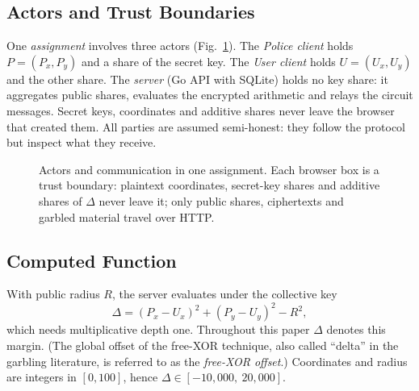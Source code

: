 \documentclass[conference,letterpaper]{IEEEtran}
\begin{document}
\subsection{Actors and Trust Boundaries}
One \emph{assignment} involves three actors (Fig.~\ref{fig:arch}). The \emph{Police client} holds $P = (P_x, P_y)$ and a share of the secret key. The \emph{User client} holds $U = (U_x, U_y)$ and the other share. The \emph{server} (Go API with SQLite) holds no key share: it aggregates public shares, evaluates the encrypted arithmetic and relays the circuit messages. Secret keys, coordinates and additive shares never leave the browser that created them. All parties are assumed semi-honest: they follow the protocol but inspect what they receive.

\begin{figure}[t]
\centering
{}
\caption{Actors and communication in one assignment. Each browser box is a trust boundary: plaintext coordinates, secret-key shares and additive shares of $\Delta$ never leave it; only public shares, ciphertexts and garbled material travel over HTTP.}
\label{fig:arch}
\end{figure}

\subsection{Computed Function}
With public radius $R$, the server evaluates under the collective key
\begin{equation}
\Delta = (P_x - U_x)^2 + (P_y - U_y)^2 - R^2 ,
\label{eq:delta}
\end{equation}
which needs multiplicative depth one. Throughout this paper $\Delta$ denotes this margin. (The global offset of the free-XOR technique, also called ``delta'' in the garbling literature, is referred to as the \emph{free-XOR offset}.) Coordinates and radius are integers in $[0, 100]$, hence $\Delta \in [-10{,}000,\ 20{,}000]$.
\end{document}
